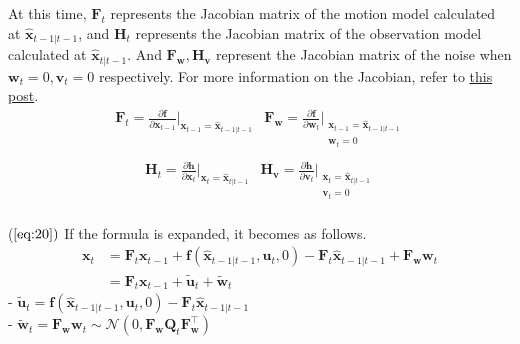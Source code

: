 \documentclass[10pt]{article}
\begin{document}
At this time, $\mathbf{F}_{t}$ represents the Jacobian matrix of the motion model calculated at $\hat{\mathbf{x}}_{t-1|t-1}$, and $\mathbf{H}_{t}$ represents the Jacobian matrix of the observation model calculated at $\hat{\mathbf{x}}_{t|t-1}$. And $\mathbf{F}_{\mathbf{w}}, \mathbf{H}_{\mathbf{v}}$ represent the Jacobian matrix of the noise when $\mathbf{w}_{t}=0, \mathbf{v}_{t}=0$ respectively. For more information on the Jacobian, refer to \href{https://alida.tistory.com/11#67.2.-jacobian-matrix}{this post}.
\begin{equation}
	\begin{aligned}
		 \mathbf{F}_{t} = \frac{\partial \mathbf{f}}{\partial \mathbf{x}_{t-1}}\bigg|_{\mathbf{x}_{t-1}=\hat{\mathbf{x}}_{t-1|t-1}} & \mathbf{F}_{\mathbf{w}} = \frac{\partial \mathbf{f}}{\partial \mathbf{w}_{t}} \bigg|_{\substack{  \mathbf{x}_{t-1}=\hat{\mathbf{x}}_{t-1|t-1} \\  \mathbf{w}_{t}=0}}   \\
	\end{aligned} 
\end{equation}
\begin{equation}
	\begin{aligned}
		 \mathbf{H}_{t} = \frac{\partial \mathbf{h}}{\partial \mathbf{x}_{t}}\bigg|_{\mathbf{x}_{t}=\hat{\mathbf{x}}_{t|t-1}}  & \mathbf{H}_{\mathbf{v}} = \frac{\partial \mathbf{h}}{\partial \mathbf{v}_{t}} \bigg|_{\substack{ \mathbf{x}_{t}=\hat{\mathbf{x}}_{t|t-1} \\   \mathbf{v}_{t} = 0}} \\
	\end{aligned}
\end{equation}

($\ref{eq:20})$ If the formula is expanded, it becomes as follows.
\begin{equation} \label{eq:ekf1}
	\boxed{  \begin{aligned}
			\mathbf{x}_{t} & = \mathbf{F}_{t}\mathbf{x}_{t-1} + 
			\mathbf{f}(\hat{\mathbf{x}}_{t-1|t-1}, \mathbf{u}_{t} , 0 ) - \mathbf{F}_{t} \hat{\mathbf{x}}_{t-1|t-1} + \mathbf{F}_{\mathbf{w}} \mathbf{w}_{t} \\
			& =  \mathbf{F}_{t}\mathbf{x}_{t-1} + \tilde{\mathbf{u}}_{t} + \tilde{\mathbf{w}}_{t} 
	\end{aligned} }
\end{equation}
- $\tilde{\mathbf{u}}_{t} = \mathbf{f}(\hat{\mathbf{x}}_{t-1|t-1}, \mathbf{u}_{t} , 0 ) - \mathbf{F}_{t} \hat{\mathbf{x}}_{t-1|t-1}$\\
- $\tilde{\mathbf{w}}_{t} = \mathbf{F}_{\mathbf{w}} \mathbf{w}_{t} \sim \mathcal{N}(0,  \mathbf{F}_{\mathbf{w}}\mathbf{Q}_{t} \mathbf{F}_{\mathbf{w}}^{\intercal})$\\
\end{document}
